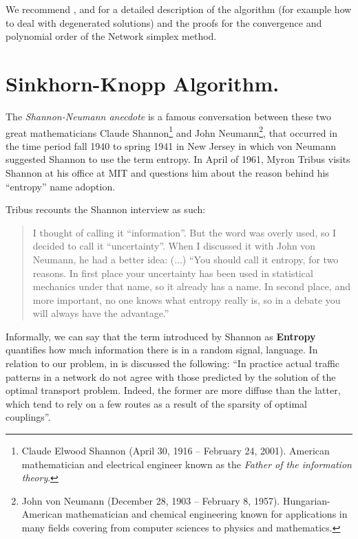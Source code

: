 We recommend \cite{Cuturi2018CompOT}, \cite{Orlin1997PolynomialTimeNetworkSimplex} and \cite{Tarjan1997DynamicTreesNetworkSimplex} for a detailed description of the algorithm (for example how to deal with degenerated solutions) and the proofs for the convergence and polynomial order of the Network simplex method.


\section{Sinkhorn-Knopp Algorithm.}
The \emph{Shannon-Neumann anecdote} is a famous conversation between these two great mathematicians Claude Shannon\footnote{Claude Elwood Shannon (April 30, 1916 – February 24, 2001). American mathematician and electrical engineer known as the \textit{Father of the information theory}.} and  John Neumann\footnote{John von Neumann (December 28, 1903 – February 8, 1957). Hungarian-American mathematician and chemical engineering known for applications in many fields covering from computer sciences to physics and mathematics.}, that occurred in the time period fall 1940 to spring 1941 in New Jersey in which von Neumann suggested Shannon to use the term entropy. In April of 1961, Myron Tribus visits Shannon at his office at MIT and questions him about the reason behind his ``entropy'' name adoption.	

Tribus recounts the Shannon interview \cite{Tribus1964Shannon} as such:
\begin{quote}
	I thought of calling it ``information''. But the word was overly used,
	so I decided to call it ``uncertainty''. When I discussed it with John von Neumann, he had a better idea: (...) ``You should call it entropy, for two reasons. In first place your uncertainty has been used in statistical mechanics under that name, so it already has a name. In second place, and more important, no one knows what entropy really is, so in a debate you will always have the advantage.''
\end{quote}


Informally, we can say that the term introduced by Shannon as \textbf{Entropy} quantifies how much information there is in a random signal, language. In relation to our problem, in \cite{Cuturi2018CompOT} is discussed the following: ``In practice actual traffic patterns in a network do not agree with those predicted by the solution of the optimal transport problem. Indeed, the former are more diffuse than the latter, which tend to rely on a few routes as a result of the sparsity of optimal couplings''. \\

